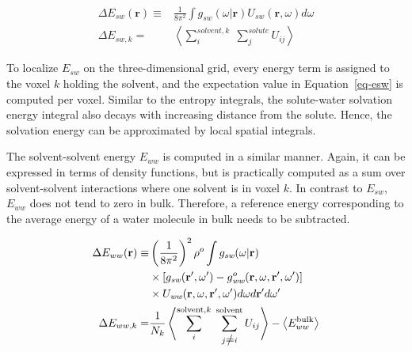 \documentclass[9pt,tutorial]{livecoms}
\renewcommand{\neq}{\setbox0\hbox{=}\rlap{\hbox to \wd0{\hss /\hss}}\box0}
\begin{document}
\begin{equation}
\begin{aligned}
\label{eq-esw}
	\Delta E_{sw}(\textbf{r}) \equiv& \frac{1}{8\pi^2} \int g_\textit{sw}\left(\omega|\textbf{r}\right) U_\textit{sw}\left(\textbf{r}, \omega\right) d\omega \\
	\Delta E_{sw,k}=& \left\langle \sum_i^{\textit{solvent},k} \; \sum_j^\textit{solute} U_{ij}\right\rangle
\end{aligned}
\end{equation}

To localize $E_{sw}$ on the three-dimensional grid, every energy term is assigned to the voxel $k$ holding the solvent, and the expectation value in Equation~\ref{eq-esw} is computed per voxel.
Similar to the entropy integrals, the solute-water solvation energy integral also decays with increasing distance from the solute. Hence, the solvation energy can be approximated by local spatial integrals. 

The solvent-solvent energy $E_{ww}$ is computed in a similar manner.
Again, it can be expressed in terms of density functions, but is practically computed as a sum over solvent-solvent interactions where one solvent is in voxel $k$.
In contrast to $E_{sw}$, $E_{ww}$ does not tend to zero in bulk.
Therefore, a reference energy corresponding to the average energy of a water molecule in bulk needs to be subtracted.


\begin{equation}
\begin{aligned}
	\Delta E_{ww}(\textbf{r}) \equiv & \left(\frac{1}{8\pi^2} \right)^2 \rho^o \int g_\textit{sw}(\omega|\textbf{r}) \\
	& \times \left[g_\textit{sw}(\textbf{r}^\prime , \omega^\prime) - g^o_\textit{ww} (\textbf{r}, \omega, \textbf{r}^\prime, \omega^\prime )\right] \\
	& \times U_\textit{ww}(\textbf{r}, \omega, \textbf{r}^\prime, \omega^\prime)d\omega d\textbf{r}^\prime d\omega^\prime \\
	\Delta E_{ww,k} =& \frac{1}{N_k} \left\langle \sum_i^{\text{solvent},k} \; \sum_{j \neq i}^\text{solvent} U_{ij}\right\rangle - \left\langle E_{ww}^\text{bulk}\right\rangle
\end{aligned}
\end{equation}
\end{document}

